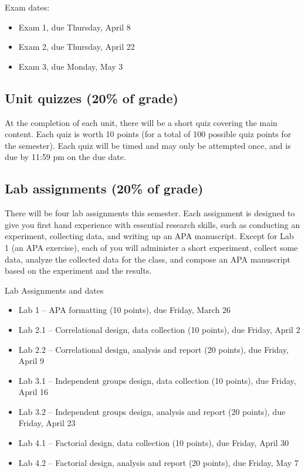 \documentclass[10pt]{article}
\begin{document}
Exam dates:

\begin{itemize}
\item Exam 1, due Thursday, April 8
\item Exam 2, due Thursday, April 22
\item Exam 3, due Monday, May 3
\end{itemize}

\subsection*{Unit quizzes (20\% of grade)}
\label{sec:orgf52ad38}

At the completion of each unit, there will be a short quiz covering the main content.  Each quiz is worth 10 points (for a total of 100 possible quiz points for the semester).  Each quiz will be timed and may only be attempted once, and is due by 11:59 pm on the due date.

\subsection*{Lab assignments (20\% of grade)}
\label{sec:org2be9e22}

There will be four lab assignments this semester.  Each assignment is designed to give you first hand experience with essential research skills, such as conducting an experiment, collecting data, and writing up an APA manuscript.  Except for Lab 1 (an APA exercise), each of you will administer a short experiment, collect some data, analyze the collected data for the class, and compose an APA manuscript based on the experiment and the results. 

Lab Assignments and dates

\begin{itemize}
\item Lab 1 – APA formatting (10 points), due Friday, March 26
\item Lab 2.1 – Correlational design, data collection (10 points), due Friday, April 2
\item Lab 2.2 – Correlational design, analysis and report (20 points), due Friday, April 9
\item Lab 3.1 – Independent groups design, data collection (10 points), due Friday, April 16
\item Lab 3.2 – Independent groups design, analysis and report (20 points), due Friday, April 23
\item Lab 4.1 – Factorial design, data collection (10 points), due Friday, April 30
\item Lab 4.2 – Factorial design, analysis and report (20 points), due Friday, May 7
\end{itemize}
\end{document}
